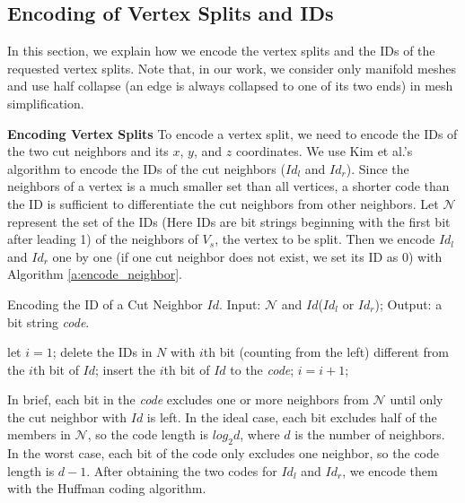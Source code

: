     \subsection{Encoding of Vertex Splits and IDs}
    \label{ss:dstream:encoding}
	In this section, we explain how we encode the vertex splits 
    and the IDs of the requested vertex splits.  
    Note that, in our work, we consider only manifold meshes and use half 
	collapse (an edge is always collapsed to one of its two ends) in mesh simplification.
    
    \textbf{Encoding Vertex Splits}
	To encode a vertex split, we need to encode the IDs of the two
	cut neighbors and its $x$, $y$, and $z$ coordinates.
    We use Kim et al.'s algorithm \cite{multiresolution:kim}
    to encode the IDs of the cut neighbors ($Id_l$ and $Id_r$). 
    Since the neighbors of a vertex is a much smaller set 
    than all vertices, a shorter code than the ID is sufficient
    to differentiate the cut neighbors from other neighbors. 
    Let $\mathcal{N}$ represent the set of the IDs 
    (Here IDs are bit strings beginning with the first bit after leading 1)
    of the neighbors of $V_s$, the vertex to be split. 
    Then we encode $Id_l$ and $Id_r$ one by one 
    (if one cut neighbor does not exist, we set its ID as $0$)
    with Algorithm \ref{a:encode_neighbor}.
    \begin{algorithm}
    \caption[Encoding the ID of a Cut Neighbor $Id$.]{Encoding the ID of a Cut Neighbor $Id$. 
    Input: $\mathcal{N}$ and $Id$($Id_l$ or $Id_r$); Output: a bit string \emph{code}.
    \label{a:encode_neighbor}}
    \begin{algorithmic}
    \STATE let $i = 1$;
        \STATE delete the IDs in $N$ with $i$th bit (counting from the left) different from the $i$th bit of $Id$;
            \STATE insert the $i$th bit of $Id$ to the \emph{code};
        \ENDIF
        \STATE $i=i+1$;
    \ENDWHILE
    \end{algorithmic}
    \end{algorithm}
    In brief, each bit in the \emph{code} excludes one or more neighbors
    from $\mathcal{N}$ until only the cut neighbor with $Id$ is left. 
    In the ideal case, each bit excludes half of the members
    in $\mathcal{N}$, so the code length is $log_{2}d$, 
    where $d$ is the number of neighbors.
    In the worst case, each bit of the code only excludes one neighbor,
    so the code length is $d-1$. 
    After obtaining the two codes for $Id_l$ and $Id_r$, we encode them with the Huffman coding algorithm.

